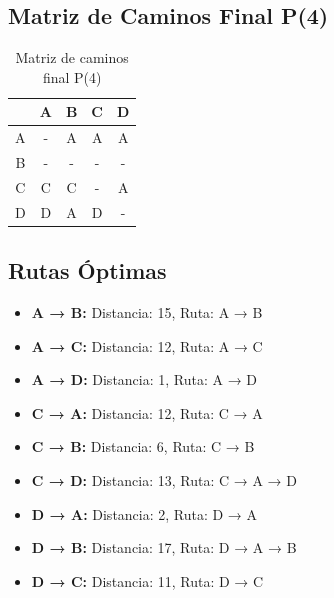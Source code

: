 \documentclass[12pt]{article}
\begin{document}
\clearpage
\subsection{Matriz de Caminos Final P(4)}
\begin{table}[h!]
\centering
\begin{tabular}{|c|c|c|c|c|}
\hline
 & A & B & C & D \\\hline
A & - & A & A & A \\\hline
B & - & - & - & - \\\hline
C & C & C & - & A \\\hline
D & D & A & D & - \\\hline
\end{tabular}
\caption{Matriz de caminos final P(4)}
\end{table}

\clearpage
\subsection{Rutas Óptimas}
\begin{itemize}
\item \textbf{A → B:} Distancia: 15, Ruta: A → B
\item \textbf{A → C:} Distancia: 12, Ruta: A → C
\item \textbf{A → D:} Distancia: 1, Ruta: A → D
\item \textbf{C → A:} Distancia: 12, Ruta: C → A
\item \textbf{C → B:} Distancia: 6, Ruta: C → B
\item \textbf{C → D:} Distancia: 13, Ruta: C → A → D
\item \textbf{D → A:} Distancia: 2, Ruta: D → A
\item \textbf{D → B:} Distancia: 17, Ruta: D → A → B
\item \textbf{D → C:} Distancia: 11, Ruta: D → C
\end{itemize}
\end{document}
